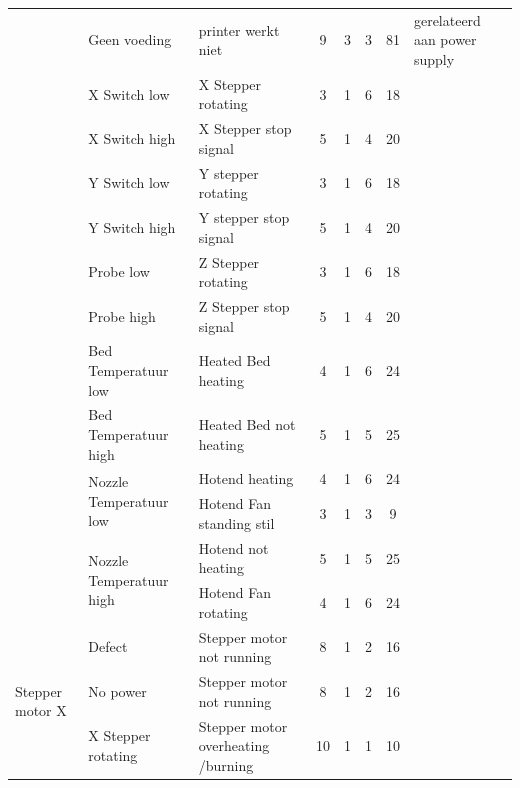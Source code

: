 \documentclass{article}
\begin{document}
\begin{landscape}
\begin{longtable}{|l|l|l|c|c|c|c|l|}
                                            & Geen voeding              & printer werkt niet        & 9 & 3 & 3 & 81 & gerelateerd aan power supply\\
                                            & X Switch low              & X Stepper rotating        & 3 & 1 & 6 & 18 & \\
                                            & X Switch high             & X Stepper stop signal     & 5 & 1 & 4 & 20 & \\
                                            & Y Switch low              & Y stepper rotating        & 3 & 1 & 6 & 18 & \\
                                            & Y Switch high             & Y stepper stop signal     & 5 & 1 & 4 & 20 & \\
                                            & Probe low                 & Z Stepper rotating        & 3 & 1 & 6 & 18 & \\
                                            & Probe high                & Z Stepper stop signal     & 5 & 1 & 4 & 20 & \\
                                            & Bed Temperatuur low       & Heated Bed heating        & 4 & 1 & 6 & 24 & \\
                                            & Bed Temperatuur high      & Heated Bed not heating    & 5 & 1 & 5 & 25 & \\
                                            & \multirow{2}{*}{Nozzle Temperatuur low}    & Hotend heating            & 4 & 1 & 6 & 24 & \\
                                            &                                            & Hotend Fan standing stil  & 3 & 1 & 3 & 9 & \\
                                            & \multirow{2}{*}{Nozzle Temperatuur high}   & Hotend not heating        & 5 & 1 & 5 & 25 & \\
                                            &                                            & Hotend Fan rotating       & 4 & 1 & 6 & 24 & \\
                                            \hline
        \multirow{4}{*}{Stepper motor X}    & Defect                & Stepper motor not running             & 8 & 1 & 2 & 16 & \\
                                            & No power              & Stepper motor not running             & 8 & 1 & 2 & 16 & \\
                                            & X Stepper rotating    & Stepper motor overheating /burning    & 10 & 1 & 1 & 10 & \\

\end{longtable}
\end{landscape}
\end{document}
